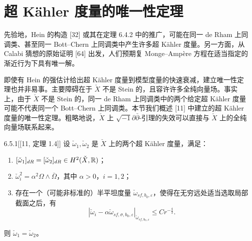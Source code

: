 \section{超 Kähler 度量的唯一性定理}

先验地，Hein 的构造 [32] 或其在定理 6.4.2 中的推广，可能在同一 de Rham 上同调类、甚至同一 Bott--Chern 上同调类中产生许多超 Kähler 度量。另一方面，从 Calabi 猜想的原始证明 [64] 出发，人们预期复 Monge--Ampère 方程在适当指定的渐近行为下具有唯一解。

即使有 Hein 的强估计给出超 Kähler 度量到模型度量的快速衰减，建立唯一性定理也并非易事。主要障碍在于 $\check X$ 不是 Stein 的，且容许许多全纯向量场。事实上，由于 $\check X$ 不是 Stein 的，同一 de Rham 上同调类中的两个给定超 Kähler 度量可能不代表同一个 Bott--Chern 上同调类。本节我们概述 [11] 中建立的超 Kähler 度量的唯一性定理。粗略地说，$\check X$ 上 $\sqrt{-1}\partial\bar\partial$-引理的失效可以直接与 $\check X$ 上的全纯向量场联系起来。

\begin{theorem}{6.5.1}[{[11, 定理 1.4]}]
设 $\check\omega_1,\check\omega_2$ 是 $\check X$ 上的两个超 Kähler 度量，满足：
\begin{enumerate}
\item $[\check\omega_1]_{dR}=[\check\omega_2]_{dR}\in H^2(\check X,\mathbb{R})$；
\item $\check\omega_i^2=\alpha^2\Omega\wedge\bar\Omega$，其中 $\alpha>0$，$i=1,2$；
\item 存在一个（可能非标准的）半平坦度量 $\check\omega_{sf,b_0,\varepsilon}$，使得在无穷远处适当选取局部截面之后，有
\begin{equation}
|\check\omega_i-\alpha\check\omega_{sf,\sigma,b_0,\varepsilon}|_{\check\omega_{sf,b_0,\varepsilon}}\le Cr^{-\frac43}. \tag{6.5.1}
\end{equation}
\end{enumerate}
则 $\check\omega_1=\check\omega_2$。
\end{theorem}

